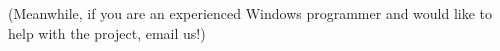 \documentclass{article}
\begin{document}
(Meanwhile, if you are an experienced Windows programmer and would like
to help with the project, email us!)


\begin{comment}
\TL{} can be installed on systems running Windows 9x, \acro{ME},
\acro{NT}, \acro{2K} or \acro{XP}.  Older versions of Windows (3.1x)
and \acro{MS-DOS} are not supported.

It is necessary to have your Windows set up so that it uses the
Microsoft Joliet extensions for reading \CD{}s; simply look at the \CD{}
in Explorer and see whether it shows long, mixed-case, file names. If it
does not, you must install the Joliet extensions.

The Windows \TeX{} system included in \TL{} is no more and no less
than the \fpTeX{} distribution.  It includes a \texttt{dvi} previewer,
\textsf{Windvi}, which is similar in usage to the established Unix
\textsf{xdvi}. The documentation can be found in
\OnCD{texmf/doc/html/windvi/windvi.html}.

\subsection{The \texttt{TeXLive.exe} program}

\begin{figure*}
 \begin{center}
  \ifnum \Status=1
    \texttt{[image: pictures/Welcome-to-TeXLive]}
  \else
    \ifnum \Status=2
        \texttt{[image: pictures/Welcome-to-TeXLive.jpg]}
    \else
        \texttt{[image: pictures/Welcome-to-TeXLive]}
    \fi
  \fi
 \end{center}
 \caption{``Welcome to \TL'' window}\label{graph:welcome}
\end{figure*}

If your computer is configured to let the \CD{} autostart, then a dialog
box with a menu bar will popup on the screen, and you will have several
choices from there:

\begin{itemize*}
\item Install \TeX{} on your hard disk
\item Do maintenance on your \TeX{} system.
\item Remove the \TeX{} system.
\item Use \TeX{} off the \TL{} \CD{} or \DVD{}.
\item Browse documentation: \TL{} documentation, TUG web
  pages, \fpTeX web pages.
\item Run the \cmdname{TeXdocTK} application to find specific documentation.
\end{itemize*}


\end{comment}
\end{document}
